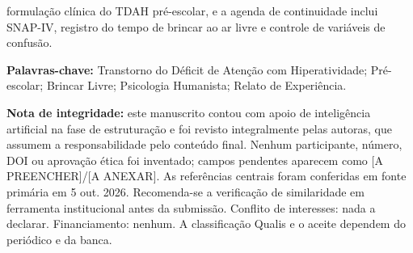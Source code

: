formula\c{c}\~ao cl\'inica do TDAH pr\'e-escolar, e a agenda de continuidade inclui SNAP-IV, registro do tempo de brincar ao ar livre e controle de vari\'aveis de confus\~ao.

\vspace{0.75cm}

\noindent\textbf{Palavras-chave:} Transtorno do D\'eficit de Aten\c{c}\~ao com Hiperatividade; Pr\'e-escolar; Brincar Livre; Psicologia Humanista; Relato de Experi\^encia.

\vspace{1.0cm}

\noindent\textbf{Nota de integridade:} este manuscrito contou com apoio de intelig\^encia artificial na fase de estrutura\c{c}\~ao e foi revisto integralmente pelas autoras, que assumem a responsabilidade pelo conte\'udo final. Nenhum participante, n\'umero, DOI ou aprova\c{c}\~ao \'etica foi inventado; campos pendentes aparecem como [A PREENCHER]/[A ANEXAR]. As refer\^encias centrais foram conferidas em fonte prim\'aria em 5 out. 2026. Recomenda-se a verifica\c{c}\~ao de similaridade em ferramenta institucional antes da submiss\~ao. Conflito de interesses: nada a declarar. Financiamento: nenhum. A classifica\c{c}\~ao Qualis e o aceite dependem do peri\'odico e da banca.

\thispagestyle{empty}
\newpage
{}
\setcounter{page}{1}

